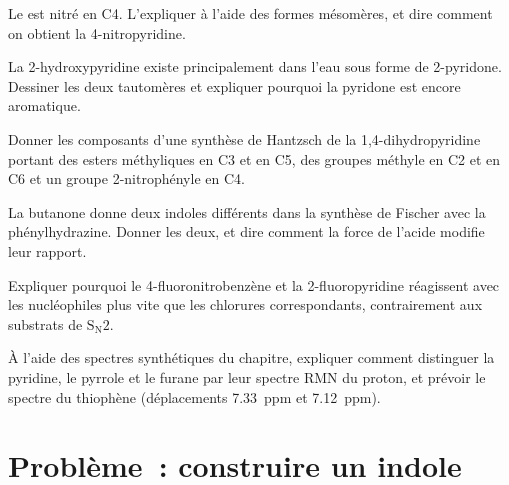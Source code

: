 \begin{exercise}[$\star\star$]\label{exo:b3:heterocycles:7}
Le  est nitré en C4. L'expliquer à l'aide des formes
mésomères, et dire comment on obtient la 4-nitropyridine.
\end{exercise}

\begin{exercise}[$\star\star$]\label{exo:b3:heterocycles:8}
La 2-hydroxypyridine existe principalement dans l'eau sous forme de
2-pyridone. Dessiner les deux tautomères et expliquer pourquoi la pyridone
est encore aromatique.
\end{exercise}

\begin{exercise}[$\star\star$]\label{exo:b3:heterocycles:9}
Donner les composants d'une synthèse de Hantzsch de la 1,4-dihydropyridine
portant des esters méthyliques en C3 et en C5, des groupes méthyle en C2 et
en C6 et un groupe 2-nitrophényle en C4.
\end{exercise}

\begin{exercise}[$\star\star\star$]\label{exo:b3:heterocycles:10}
La butanone donne deux indoles différents dans la synthèse de Fischer avec
la phénylhydrazine. Donner les deux, et dire comment la force de l'acide
modifie leur rapport.
\end{exercise}

\begin{exercise}[$\star\star\star$]\label{exo:b3:heterocycles:11}
Expliquer pourquoi le 4-fluoronitrobenzène et la 2-fluoropyridine réagissent
avec les nucléophiles plus vite que les chlorures correspondants, contrairement aux substrats de $\mathrm S_\mathrm N2$.
\end{exercise}

\begin{exercise}[$\star\star\star$]\label{exo:b3:heterocycles:12}
À l'aide des spectres synthétiques du chapitre, expliquer comment
distinguer la pyridine, le pyrrole et le furane par leur spectre RMN du
proton, et prévoir le spectre du
thiophène (déplacements \qty{7.33}{ppm} et \qty{7.12}{ppm}).
\end{exercise}

\section{Problème~: construire un indole}

